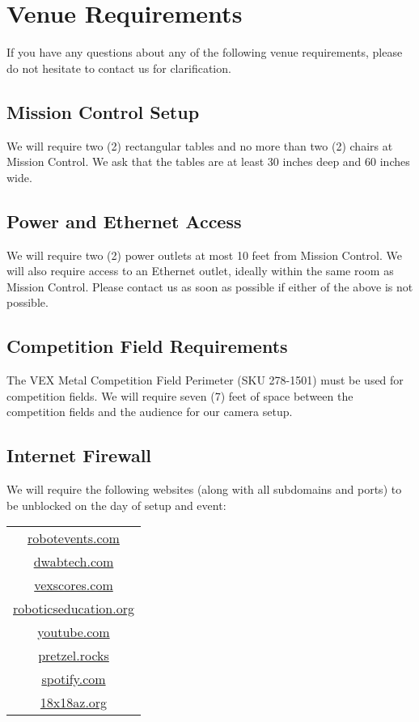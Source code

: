 \documentclass[12pt]{article}
\begin{document}
\section{Venue Requirements}
If you have any questions about any of the following venue requirements, please do not hesitate to contact us for clarification.
\subsection{Mission Control Setup}
We will require two (2) rectangular tables and no more than two (2) chairs at Mission Control.
We ask that the tables are at least 30 inches deep and 60 inches wide.

\subsection{Power and Ethernet Access}
We will require two (2) power outlets at most 10 feet from Mission Control.
We will also require access to an Ethernet outlet, ideally within the same room as Mission Control.
Please contact us as soon as possible if either of the above is not possible.

\subsection{Competition Field Requirements}
The VEX Metal Competition Field Perimeter (SKU 278-1501) must be used for competition fields.
We will require seven (7) feet of space between the competition fields and the audience for our camera setup.

\subsection{Internet Firewall}
We will require the following websites (along with all subdomains and ports) to be unblocked on the day of setup and event:

\begin{centering}

\begin{tabular}{|c|}
    \hline
    \url{robotevents.com} \\
    \url{dwabtech.com} \\
    \url{vexscores.com} \\
    \url{roboticseducation.org}\\
    \url{youtube.com}\\ 
        \url{pretzel.rocks} \\
        \url{spotify.com}\\
        \url{18x18az.org} \\
    \hline
\end{tabular}

\end{centering}
\vspace{1em}
\end{document}
